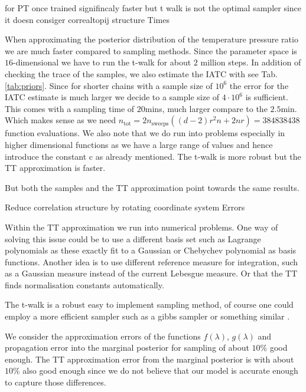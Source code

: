 for PT
once trained signifincaly faster 
but t walk is not the optimal sampler since it doesn consiger correaltopij structure
Times

When approximating the posterior distribution of the temperature pressure ratio we are much faster compared to sampling methods.
Since the parameter space is $16$-dimensional we have to run the t-walk for about $2$ million steps.
In addition of checking the trace of the samples, we also estimate the IATC with \cite{UwerrM} see Tab. \ref{tab:priors}.
Since for shorter chains with a sample size of $10^6$ the error for the IATC estimate is much larger we decide to a sample size of $4 \cdot 10^6$ is sufficient.
This comes with a sampling time of $20$mins, much larger compare to the $2.5$min.
Which makes sense as we need $n_{\text{tot}} = 2n_{\text{sweeps}}((d-2)r^2n+ 2nr) = 384838438$ function evaluations.
We also note that we do run into problems especially in higher dimensional functions as we have a large range of values and hence introduce the constant c as already mentioned.
The t-walk is more robust but the TT approximation is faster.

But both the samples and the TT approximation point towards the same results.

Reduce correlation structure by rotating coordinate system
Errors

Within the TT approximation we run into numerical problems.
One way of solving this issue could be to use a different basis set such as Lagrange polynomials as these exactly fit to a Gaussian or Chebychev polynomial as basis functions.
Another idea is to use different reference measure for integration, such as a Gaussian measure instead of the current Lebesgue measure.
Or that the TT finds normalisation constants automatically.



The t-walk is a robust easy to implement sampling method, of course one could employ a more efficient sampler such as a gibbs sampler or something similar \cite{}.

We consider the approximation errors of the functions $f(\lambda)$, $g(\lambda)$ and propagation error into the marginal posterior for sampling of about $10\%$ good enough.
The TT approximation error from the marginal posterior is with about $10\%$ also good enough since we do not believe that our model is accurate enough to capture those differences.

